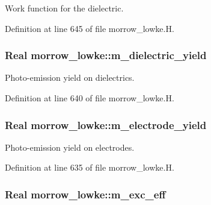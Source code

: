 Work function for the dielectric. 



Definition at line 645 of file morrow\+\_\+lowke.\+H.

\subsubsection[{\texorpdfstring{m\+\_\+dielectric\+\_\+yield}{m_dielectric_yield}}]{\setlength{\rightskip}{0pt plus 5cm}Real morrow\+\_\+lowke\+::m\+\_\+dielectric\+\_\+yield}\hypertarget{classmorrow__lowke_a5a5ae3870193ab028cb55838fc6452a0}{}\label{classmorrow__lowke_a5a5ae3870193ab028cb55838fc6452a0}


Photo-\/emission yield on dielectrics. 



Definition at line 640 of file morrow\+\_\+lowke.\+H.

\subsubsection[{\texorpdfstring{m\+\_\+electrode\+\_\+yield}{m_electrode_yield}}]{\setlength{\rightskip}{0pt plus 5cm}Real morrow\+\_\+lowke\+::m\+\_\+electrode\+\_\+yield}\hypertarget{classmorrow__lowke_a6c1ce2fd5df5d409cb77b38acc680f27}{}\label{classmorrow__lowke_a6c1ce2fd5df5d409cb77b38acc680f27}


Photo-\/emission yield on electrodes. 



Definition at line 635 of file morrow\+\_\+lowke.\+H.

\subsubsection[{\texorpdfstring{m\+\_\+exc\+\_\+eff}{m_exc_eff}}]{\setlength{\rightskip}{0pt plus 5cm}Real morrow\+\_\+lowke\+::m\+\_\+exc\+\_\+eff}\hypertarget{classmorrow__lowke_ae680421e16733ea1748459eb70b50d36}{}\label{classmorrow__lowke_ae680421e16733ea1748459eb70b50d36}


